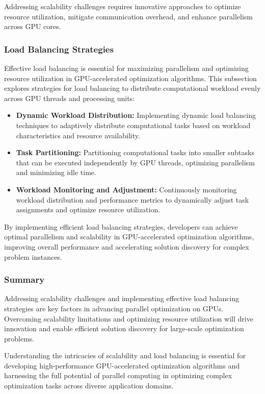 \documentclass[11pt]{report}
\begin{document}
            Addressing scalability challenges requires innovative approaches to optimize resource utilization, mitigate communication overhead, and enhance parallelism across GPU cores.
        \subsubsection{Load Balancing Strategies}
        Effective load balancing is essential for maximizing parallelism and optimizing resource utilization in GPU-accelerated optimization algorithms. This subsection explores strategies for load balancing to distribute computational workload evenly across GPU threads and processing units:
        \begin{itemize}
            \item \textbf{Dynamic Workload Distribution:} Implementing dynamic load balancing techniques to adaptively distribute computational tasks based on workload characteristics and resource availability.
        
            \item \textbf{Task Partitioning:} Partitioning computational tasks into smaller subtasks that can be executed independently by GPU threads, optimizing parallelism and minimizing idle time.
        
            \item \textbf{Workload Monitoring and Adjustment:} Continuously monitoring workload distribution and performance metrics to dynamically adjust task assignments and optimize resource utilization.
        \end{itemize}
        By implementing efficient load balancing strategies, developers can achieve optimal parallelism and scalability in GPU-accelerated optimization algorithms, improving overall performance and accelerating solution discovery for complex problem instances.
        \subsubsection{Summary}
        Addressing scalability challenges and implementing effective load balancing strategies are key factors in advancing parallel optimization on GPUs. Overcoming scalability limitations and optimizing resource utilization will drive innovation and enable efficient solution discovery for large-scale optimization problems.

        Understanding the intricacies of scalability and load balancing is essential for developing high-performance GPU-accelerated optimization algorithms and harnessing the full potential of parallel computing in optimizing complex optimization tasks across diverse application domains.
\end{document}
